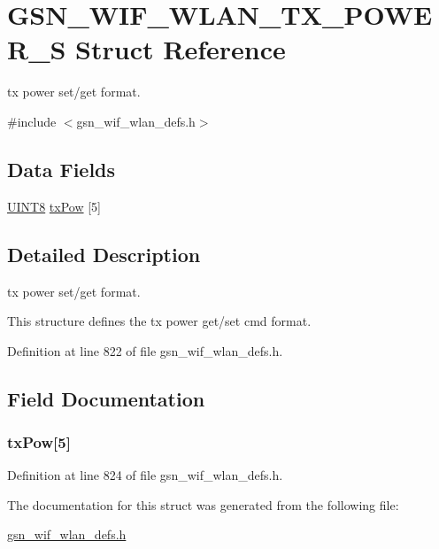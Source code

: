 \hypertarget{a00408}{
\section{GSN\_\-WIF\_\-WLAN\_\-TX\_\-POWER\_\-S Struct Reference}
\label{a00408}
}


tx power set/get format.  




{\ttfamily \#include $<$gsn\_\-wif\_\-wlan\_\-defs.h$>$}

\subsection*{Data Fields}
\begin{DoxyCompactItemize}
\item 
\hyperlink{a00660_gab27e9918b538ce9d8ca692479b375b6a}{UINT8} \hyperlink{a00408_a76039e8221ba3dbe0c97e203025c3322}{txPow} \mbox{[}5\mbox{]}
\end{DoxyCompactItemize}


\subsection{Detailed Description}
tx power set/get format. 

This structure defines the tx power get/set cmd format. 

Definition at line 822 of file gsn\_\-wif\_\-wlan\_\-defs.h.



\subsection{Field Documentation}
\hypertarget{a00408_a76039e8221ba3dbe0c97e203025c3322}{
\subsubsection[{txPow}]{ {\bf txPow}\mbox{[}5\mbox{]}}}
\label{a00408_a76039e8221ba3dbe0c97e203025c3322}


Definition at line 824 of file gsn\_\-wif\_\-wlan\_\-defs.h.



The documentation for this struct was generated from the following file:\begin{DoxyCompactItemize}
\item 
\hyperlink{a00613}{gsn\_\-wif\_\-wlan\_\-defs.h}\end{DoxyCompactItemize}
